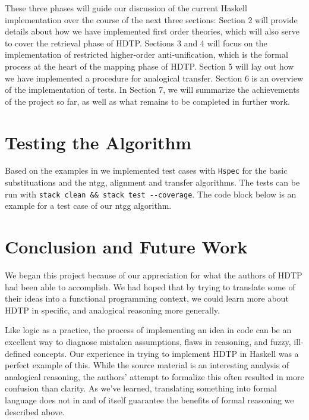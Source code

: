 \documentclass[12pt,a4paper]{article}
\begin{document}
These three phases will guide our discussion of the current Haskell implementation over the course of the next three sections: Section 2 will provide details about how we have implemented first order theories, which will also serve to cover the retrieval phase of HDTP. Sections 3 and 4 will focus on the implementation of restricted higher-order anti-unification, which is the formal process at the heart of the mapping phase of HDTP. Section 5 will lay out how we have implemented a procedure for analogical transfer. Section 6 is an overview of the implementation of tests. In Section 7, we will summarize the achievements of the project so far, as well as what remains to be completed in further work.
% 



\section{Testing the Algorithm}

Based on the examples in \cite{Schmidt-2014} we implemented test cases with \texttt{Hspec} for the basic substituations and the ntgg, alignment and transfer algorithms. The tests can be run with \verb|stack clean && stack test --coverage|. The code block below is an example for a test case of our ntgg algorithm.
\vspace{2mm}


\section{Conclusion and Future Work}

We began this project because of our appreciation for what the authors of HDTP had been able to accomplish. We had hoped that by trying to translate some of their ideas into a functional programming context, we could learn more about HDTP in specific, and analogical reasoning more generally.

Like logic as a practice, the process of implementing an idea in code can be an excellent way to diagnose mistaken assumptions, flaws in reasoning, and fuzzy, ill-defined concepts. Our experience in trying to implement HDTP in Haskell was a perfect example of this. While the source material is an interesting analysis of analogical reasoning, the authors' attempt to formalize this often resulted in more confusion than clarity. As we've learned, translating something into formal language does not in and of itself guarantee the benefits of formal reasoning we described above.
\end{document}
